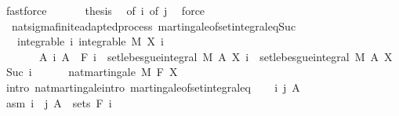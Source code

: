 \begin{isabellebody}
\ fastforce\isanewline
\ \ \isamarkupfalse%
\isanewline
\ \ \isamarkupfalse%
\ {\isacharquery}{\kern0pt}thesis\ \isamarkupfalse%
\ {\isacharasterisk}{\kern0pt}{\isacharbrackleft}{\kern0pt}of\ i{\isacharbrackright}{\kern0pt}\ {\isacharasterisk}{\kern0pt}{\isacharbrackleft}{\kern0pt}of\ j{\isacharbrackright}{\kern0pt}\ \isamarkupfalse%
\ force\isanewline
{}\isamarkupfalse%
%
\endisatagproof
{\isafoldproof}%
%
\isadelimproof
\isanewline
%
\endisadelimproof
\isanewline
{}\isamarkupfalse%
\ {\isacharparenleft}{\kern0pt}\ nat{\isacharunderscore}{\kern0pt}sigma{\isacharunderscore}{\kern0pt}finite{\isacharunderscore}{\kern0pt}adapted{\isacharunderscore}{\kern0pt}process{\isacharparenright}{\kern0pt}\ martingale{\isacharunderscore}{\kern0pt}of{\isacharunderscore}{\kern0pt}set{\isacharunderscore}{\kern0pt}integral{\isacharunderscore}{\kern0pt}eq{\isacharunderscore}{\kern0pt}Suc{\isacharcolon}{\kern0pt}\isanewline
\ \ \ integrable{\isacharcolon}{\kern0pt}\ {\isachardoublequoteopen}{\isasymAnd}i{\isachardot}{\kern0pt}\ integrable\ M\ {\isacharparenleft}{\kern0pt}X\ i{\isacharparenright}{\kern0pt}{\isachardoublequoteclose}\isanewline
\ \ \ \ \ \ \ {\isachardoublequoteopen}{\isasymAnd}A\ i{\isachardot}{\kern0pt}\ A\ {\isasymin}\ F\ i\ {\isasymLongrightarrow}\ set{\isacharunderscore}{\kern0pt}lebesgue{\isacharunderscore}{\kern0pt}integral\ M\ A\ {\isacharparenleft}{\kern0pt}X\ i{\isacharparenright}{\kern0pt}\ {\isacharequal}{\kern0pt}\ set{\isacharunderscore}{\kern0pt}lebesgue{\isacharunderscore}{\kern0pt}integral\ M\ A\ {\isacharparenleft}{\kern0pt}X\ {\isacharparenleft}{\kern0pt}Suc\ i{\isacharparenright}{\kern0pt}{\isacharparenright}{\kern0pt}{\isachardoublequoteclose}\ \isanewline
\ \ \ \ \ {\isachardoublequoteopen}nat{\isacharunderscore}{\kern0pt}martingale\ M\ F\ X{\isachardoublequoteclose}\isanewline
%
\isadelimproof
%
\endisadelimproof
%
\isatagproof
{}\isamarkupfalse%
\ {\isacharparenleft}{\kern0pt}intro\ nat{\isacharunderscore}{\kern0pt}martingale{\isachardot}{\kern0pt}intro\ martingale{\isacharunderscore}{\kern0pt}of{\isacharunderscore}{\kern0pt}set{\isacharunderscore}{\kern0pt}integral{\isacharunderscore}{\kern0pt}eq{\isacharparenright}{\kern0pt}\isanewline
\ \ \isamarkupfalse%
\ i\ j\ A\ \isamarkupfalse%
\ asm{\isacharcolon}{\kern0pt}\ {\isachardoublequoteopen}i\ {\isasymle}\ j{\isachardoublequoteclose}\ {\isachardoublequoteopen}A\ {\isasymin}\ sets\ {\isacharparenleft}{\kern0pt}F\ i{\isacharparenright}{\kern0pt}{\isachardoublequoteclose}\isanewline

\end{isabellebody}

